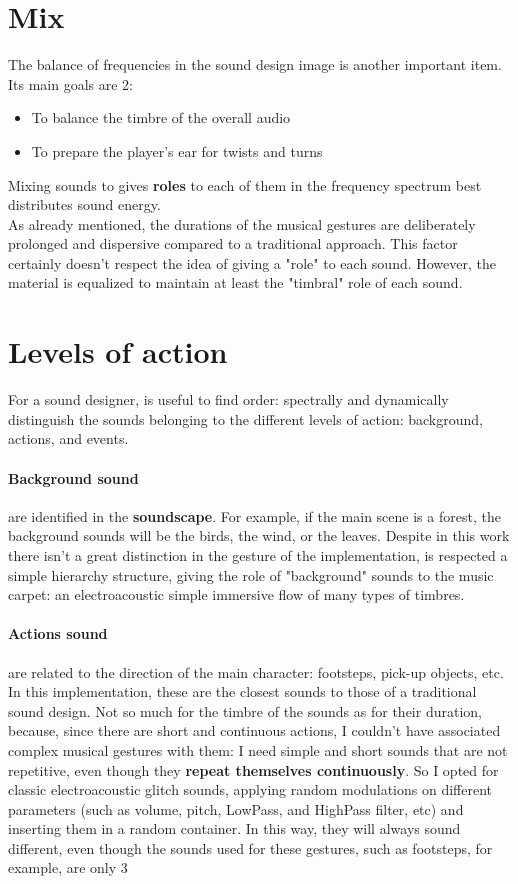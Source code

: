 \section{Mix}
The balance of frequencies in the sound design image is another important item. Its main goals are 2:

\begin{itemize}
	\item To balance the timbre of the overall audio
	\item To prepare the player's ear for twists and turns
\end{itemize}

Mixing sounds to gives \textbf{roles} to each of them in the frequency spectrum best distributes sound energy. \\
As already mentioned, the durations of the musical gestures are deliberately prolonged and dispersive compared to a traditional approach. This factor certainly doesn't respect the idea of ​​giving a "role" to each sound. However, the material is equalized to maintain at least the "timbral" role of each sound.

\section{Levels of action}
For a sound designer, is useful to find order: spectrally and dynamically distinguish the sounds belonging to the different levels of action: background, actions, and events.

\paragraph{Background sound} are identified in the \textbf{soundscape}. For example, if the main scene is a forest, the background sounds will be the birds, the wind, or the leaves. Despite in this work there isn't a great distinction in the gesture of the implementation, is respected a simple hierarchy structure, giving the role of "background" sounds to the music carpet: an electroacoustic simple immersive flow of many types of timbres.

\paragraph{Actions sound} are related to the direction of the main character: footsteps, pick-up objects, etc. In this implementation, these are the closest sounds to those of a traditional sound design. Not so much for the timbre of the sounds as for their duration, because, since there are short and continuous actions, I couldn't have associated complex musical gestures with them: I need simple and short sounds that are not repetitive, even though they \textbf{repeat themselves continuously}. So I opted for classic electroacoustic glitch sounds, applying random modulations on different parameters (such as volume, pitch, LowPass, and HighPass filter, etc) and inserting them in a random container. In this way, they will always sound different, even though the sounds used for these gestures, such as footsteps, for example, are only 3
